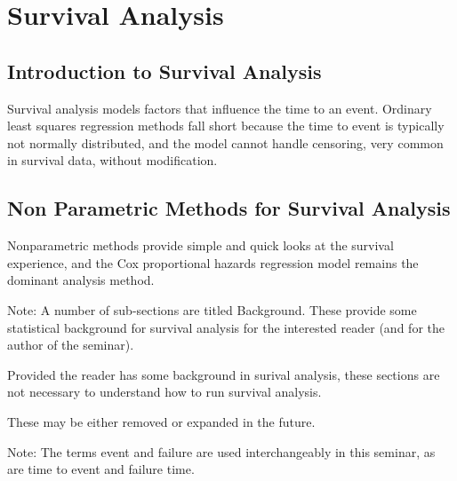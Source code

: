 \documentclass[]{article}
\title{}
\author{}
\begin{document}
\section*{Survival Analysis}
	
\subsection*{Introduction to Survival Analysis}

Survival analysis models factors that influence the time to an event. Ordinary least squares regression methods fall short because the time to event is typically not normally distributed, and the model cannot handle censoring, very common in survival data, without modification. 

\subsection*{Non Parametric Methods for Survival Analysis}
Nonparametric methods provide simple and quick looks at the survival experience, and the Cox proportional hazards regression model remains the dominant analysis method. 



Note: A number of sub-sections are titled Background. 
These provide some statistical background for survival analysis for the interested reader (and for the author of the seminar). 

Provided the reader has some background in surival analysis, these sections are not necessary to understand how to run survival analysis. 

These may be either removed or expanded in the future.

Note: The terms event and failure are used interchangeably in this seminar, as are time to event and failure time.



\end{document}
